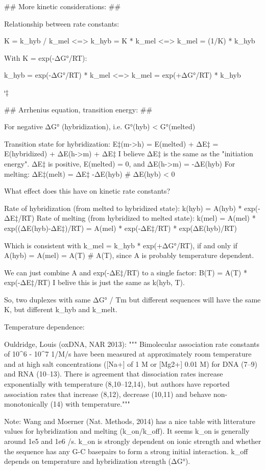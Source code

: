 ## More kinetic considerations: ##

Relationship between rate constants:

        K = k_hyb / k_mel  <=> k_hyb = K * k_mel  <=> k_mel = (1/K) * k_hyb

    With K = exp(-ΔG°/RT):

        k_hyb = exp(-ΔG°/RT) * k_mel   <=>   k_mel = exp(+ΔG°/RT) * k_hyb

ᵗ‡

## Arrhenius equation, transition energy: ##

For negative ΔG° (hybridization), i.e. G°(hyb) < G°(melted)

    Transition state for hybridization:
        E‡(m->h) = E(melted) + ΔE‡ = E(hybridized) + ΔE(h->m) + ΔE‡
    I believe ΔE‡ is the same as the "initiation energy".
    ΔE‡ is positive, E(melted) = 0, and ΔE(h->m) = -ΔE(hyb)
    For melting:
        ΔE‡(melt) = ΔE‡ -ΔE(hyb)    # ΔE(hyb) < 0


What effect does this have on kinetic rate constants?

    Rate of hybridization (from melted to hybridized state):
        k(hyb) = A(hyb) * exp(-ΔE‡/RT)
    Rate of melting (from hybridized to melted state):
        k(mel) = A(mel) * exp((ΔE(hyb)-ΔE‡)/RT)
               = A(mel) * exp(-ΔE‡/RT) * exp(ΔE(hyb)/RT)

    Which is consistent with k_mel = k_hyb * exp(+ΔG°/RT),
    if and only if A(hyb) = A(mel) = A(T)   # A(T), since A is probably temperature dependent.

    We can just combine A and exp(-ΔE‡/RT) to a single factor:
        B(T) = A(T) * exp(-ΔE‡/RT)
    I belive this is just the same as k(hyb, T).


So, two duplexes with same ΔG° / Tm but different sequences will have the same K,
but different k_hyb and k_melt.


Temperature dependence:

    Ouldridge, Louis (oxDNA, NAR 2013):
""" Bimolecular association rate constants of 10^6 - 10^7 1/M/s have been
    measured at approximately room temperature and at high salt concentrations
    ([Na+] of 1 M or [Mg2+] 0.01 M) for DNA (7–9) and RNA (10–13).
    There is agreement that dissociation rates increase exponentially
    with temperature (8,10–12,14), but authors have reported association
    rates that increase (8,12), decrease (10,11) and behave non-monotonically
    (14) with temperature."""


Note: Wang and Moerner (Nat. Methods, 2014) has a nice table with litterature values
for hybridization and melting (k_on/k_off).
    It seems k_on is generally around 1e5 and 1e6 /s.
    k_on is strongly dependent on ionic strength and whether the sequence has any G-C basepairs to form a strong initial interaction.
    k_off depends on temperature and hybridization strength (ΔG°).

